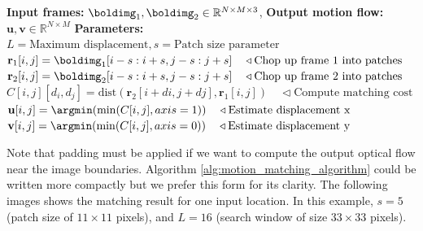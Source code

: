 \begin{algorithm}[h]
\SetAlgoVlined
\DontPrintSemicolon
\caption{{\bf Algorithm \ref{alg:motion_matching_algorithm}}: Patch matching motion estimation. The algorithm starts by chopping the two frames into overlapping patches. Then, for every patch from the first frame, we compute the distance to all the nearby patches in frame 2. Finally, for each input patch we select the closest patch from frame 2 and we record the relative displacement between the two patches. The pseudocode can be rearranged to be more memory efficient.}
\fakealgorithmcaption{}
\label{alg:motion_matching_algorithm}
{\bf Input frames:} $\boldimg_1, \boldimg_2 \in \mathbb{R}^{N \times M \times 3}$, 
{\bf Output motion flow:} $\mathbf{u}, \mathbf{v} \in \mathbb{R}^{N \times M}$\;
{\bf Parameters:} $L = \text{Maximum displacement}, s = \text{Patch size parameter}$\;
{
{
    $\mathbf{r}_1[i,j] = \boldimg_1 [i-s:i+s, j-s:j+s] \quad \triangleleft \text{Chop up frame 1 into patches}$\;
    $\mathbf{r}_2[i,j] = \boldimg_2 [i-s:i+s, j-s:j+s] \quad \triangleleft \text{Chop up frame 2 into patches}$\;
}
}
{
{
{
{
    $C[i,j][d_i,d_j] = \text{dist}(\mathbf{r}_2[i+di,j+dj], \mathbf{r}_1[i,j])
     \quad \triangleleft \text{Compute matching cost}$\;
}
}
}
}
{
{
    $\mathbf{u}[i,j] = \argmin (\min (C[i,j], axis=1)) \quad \triangleleft \text{Estimate  displacement x}$\;
    $\mathbf{v}[i,j] = \argmin (\min (C[i,j], axis=0)) \quad \triangleleft \text{Estimate  displacement y}$\;
}
}
\end{algorithm}


Note that padding must be applied if we want to compute the output optical flow near the image boundaries. Algorithm \ref{alg:motion_matching_algorithm} could be written more compactly but we prefer this form for its clarity. The following images shows the matching result for one input location. In this example, $s=5$ (patch size of $11\times11$ pixels), and $L=16$ (search window of size $33\times33$ pixels).



